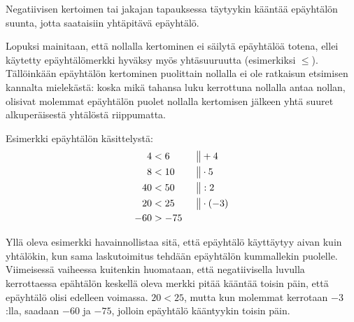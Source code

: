\begin{lukusuora}{-6}{6}{12}

\lukusuorauusi
\end{lukusuora}

Negatiivisen kertoimen tai jakajan tapauksessa täytyykin kääntää epäyhtälön suunta, jotta saataisiin yhtäpitävä epäyhtälö.


Lopuksi mainitaan, että nollalla kertominen ei säilytä epäyhtälöä totena, ellei käytetty epäyhtälömerkki hyväksy myös yhtäsuuruutta (esimerkiksi $\leq$). Tällöinkään epäyhtälön kertominen puolittain nollalla ei ole ratkaisun etsimisen kannalta mielekästä: koska mikä tahansa luku kerrottuna nollalla antaa nollan, olisivat molemmat epäyhtälön puolet nollalla kertomisen jälkeen yhtä suuret alkuperäisestä yhtälöstä riippumatta.

\begin{esimerkki}

Esimerkki epäyhtälön käsittelystä:
\begin{align*}
4&<6  \ \ \ \ \ &&\big\| +4 \\
8&<10 &&\big\| \cdot 5 \\
40&<50 &&\big\| :2 \\
20&<25 &&\big\| \cdot (-3) \\
-60&>-75
\end{align*}
\end{esimerkki}

Yllä oleva esimerkki havainnollistaa sitä, että epäyhtälö käyttäytyy aivan kuin
yhtälökin, kun sama laskutoimitus tehdään epäyhtälön kummallekin puolelle.
Viimeisessä vaiheessa kuitenkin huomataan, että negatiivisella luvulla
kerrottaessa epähtälön keskellä oleva merkki pitää kääntää toisin päin, että
epäyhtälö olisi edelleen voimassa. $20<25$, mutta kun molemmat kerrotaan
$-3$:lla, saadaan $-60$ ja $-75$, jolloin epäyhtälö kääntyykin toisin päin.

